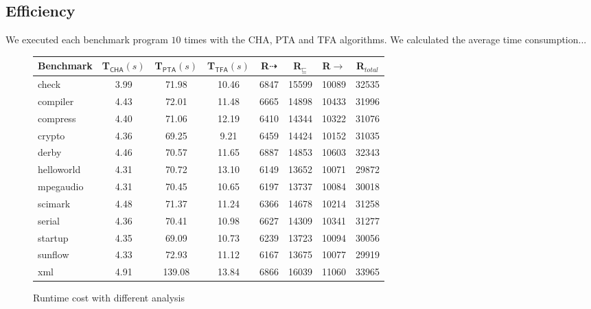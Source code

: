 \documentclass{fac}
\newcommand{\less}{\sqsubseteq}
\newcommand{\tflow}{\dashrightarrow}
\begin{document}
\subsection{Efficiency}\label{subsec:efficiency}
We executed each benchmark program $10$ times with the CHA, PTA and TFA algorithms. We calculated the average time consumption...

\begin{figure}\centering
\begin{tabular}{lccccccc}
	\hline
	\textbf{Benchmark} & \hspace{5pt}\textbf{T$_{\textsf{CHA}}(s)$}& \hspace{5pt}\textbf{T$_{\textsf{PTA}}(s)$} & \hspace{5pt}\textbf{T$_{\textsf{TFA}}(s)$} & \hspace{5pt}\textbf{R${\tflow}$}\hspace{5pt} & \hspace{5pt}\textbf{R$_{\less}$}\hspace{5pt} & \hspace{5pt}\textbf{R${\rightarrow}$} &\hspace{5pt}\textbf{R$_{total}$}\hspace{2pt}\\
	\hline
check & 3.99 & 71.98 & 10.46 & 6847 & 15599 & 10089 & 32535\\
compiler & 4.43 & 72.01 & 11.48 & 6665 & 14898 & 10433 & 31996\\
compress & 4.40 & 71.06 & 12.19 & 6410 & 14344 & 10322 & 31076\\
crypto & 4.36 & 69.25 & 9.21 & 6459 & 14424 & 10152 & 31035\\
derby & 4.46 & 70.57 & 11.65 & 6887 & 14853 & 10603 & 32343\\
helloworld & 4.31 & 70.72 & 13.10 & 6149 & 13652 & 10071 & 29872\\
mpegaudio & 4.31 & 70.45 & 10.65 & 6197 & 13737 & 10084 & 30018\\
scimark & 4.48 & 71.37 & 11.24 & 6366 & 14678 & 10214 & 31258\\
serial & 4.36 & 70.41 & 10.98 & 6627 & 14309 & 10341 & 31277\\
startup & 4.35 & 69.09 & 10.73 & 6239 & 13723 & 10094 & 30056\\
sunflow & 4.33 & 72.93 & 11.12 & 6167 & 13675 & 10077 & 29919\\
xml & 4.91 & 139.08 & 13.84 & 6866 & 16039 & 11060 & 33965\\
	\hline
\end{tabular}
\caption{Runtime cost with different analysis}
\label{experiment:TimeCost}
\end{figure}
\end{document}
